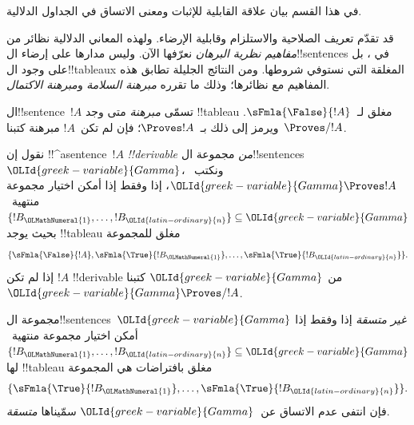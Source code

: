 \documentclass[../../../include/open-logic-section]{subfiles}
\begin{document}
      {}
      {}
      

\begin{editorial}
في هذا القسم بيان علاقة القابلية للإثبات ومعنى الاتساق في الجداول الدلالية.
\end{editorial}

\begin{explain}
قد تقدّم تعريف الصلاحية والاستلزام وقابلية الإرضاء. ولهذه المعاني
الدلالية نظائر من \emph{مفاهيم نظرية البرهان} نعرّفها الآن.
وليس مدارها على إرضاء ال!!{sentence}s في
، بل على وجود
ال!!{tableau}x المغلقة التي نستوفي شروطها. ومن النتائج الجليلة
تطابق هذه المفاهيم مع نظائرها؛ وذلك ما تقرره
\emph{مبرهنة السلامة} و\emph{مبرهنة الاكتمال}.
\end{explain}


\begin{defn}[المبرهنات]
ال!!{sentence}~$!A$ تسمّى \emph{مبرهنة} متى وجد !!{tableau} مغلق
لـ~$\sFmla{\False}{!A}$. ويرمز إلى ذلك بـ~$\Proves !A$؛
فإن لم تكن~$!A$ مبرهنة كتبنا~$\Proves/ !A$.
\end{defn}

\begin{defn}[!!^{derivability}]
نقول إن !!^a{sentence}~$!A$ \emph{!!{derivable} من} مجموعة
ال!!{sentence}s~${\OLId{greek-variable}{Gamma}}$، ونكتب~${\OLId{greek-variable}{Gamma}} \Proves !A$، إذا وفقط إذا
أمكن اختيار مجموعة منتهية~$\{!B_{\OLMathNumeral{1}}, \dots, !B_{\OLId{latin-ordinary}{n}}\} \subseteq {\OLId{greek-variable}{Gamma}}$
بحيث يوجد !!{tableau} مغلق للمجموعة
\[
\{
  \sFmla{\False}{!A},
  \sFmla{\True}{!B_{\OLMathNumeral{1}}}, \dots,
  \sFmla{\True}{!B_{\OLId{latin-ordinary}{n}}}
  \}.
\]
إذا لم تكن $!A$ !!{derivable} من ${\OLId{greek-variable}{Gamma}}$ كتبنا ${\OLId{greek-variable}{Gamma}} \Proves/
!A$.
\end{defn}

\begin{defn}[الاتساق]
مجموعة ال!!{sentence}s~${\OLId{greek-variable}{Gamma}}$ \emph{غير متسقة} إذا وفقط إذا
أمكن اختيار مجموعة منتهية~$\{!B_{\OLMathNumeral{1}}, \dots, !B_{\OLId{latin-ordinary}{n}}\} \subseteq {\OLId{greek-variable}{Gamma}}$
لها !!{tableau} مغلق بافتراضات هي المجموعة
\[
\{
  \sFmla{\True}{!B_{\OLMathNumeral{1}}}, \dots,
  \sFmla{\True}{!B_{\OLId{latin-ordinary}{n}}}  
  \}.
\]
فإن انتفى عدم الاتساق عن~${\OLId{greek-variable}{Gamma}}$ سمّيناها \emph{متسقة}.
\end{defn}
\end{document}
